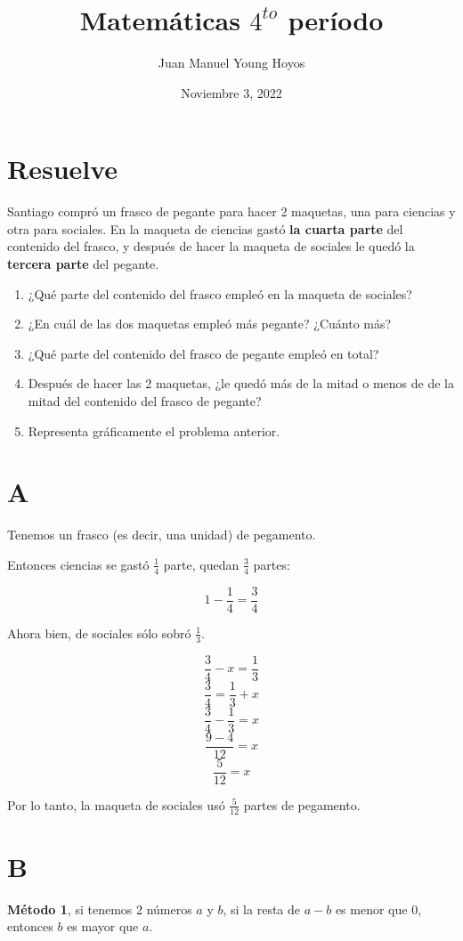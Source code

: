 \documentclass[12pt, letterpaper, twoside]{article}
\title{Matemáticas $4^{to}$ período}
\author{Juan Manuel Young Hoyos}
\date{Noviembre 3, 2022}
\begin{document}
\maketitle

\section*{Resuelve}

Santiago compró un frasco de pegante para hacer 2 maquetas, una para ciencias y
otra para sociales. En la maqueta de ciencias gastó \textbf{la cuarta parte} del
contenido del frasco, y después de hacer la maqueta de sociales le quedó la
\textbf{tercera parte} del pegante.

\renewcommand{\labelenumi}{\Alph{enumi}}
\begin{enumerate}
    \item ¿Qué parte del contenido del frasco empleó en la maqueta de sociales?
    \item ¿En cuál de las dos maquetas empleó más pegante? ¿Cuánto más?
    \item ¿Qué parte del contenido del frasco de pegante empleó en total?
    \item Después de hacer las 2 maquetas, ¿le quedó más de la mitad o menos de
    de la mitad del contenido del frasco de pegante?
    \item Representa gráficamente el problema anterior.
\end{enumerate}

\section*{A}
Tenemos un frasco (es decir, una unidad) de pegamento.

Entonces ciencias se gastó $\frac{1}{4}$ parte, quedan $\frac{3}{4}$ partes:

\[ 1 - \frac{1}{4} = \frac{3}{4} \]

Ahora bien, de sociales sólo sobró $\frac{1}{3}$.

\[ \frac{3}{4} - x = \frac{1}{3} \]
\[ \frac{3}{4} = \frac{1}{3} + x \]
\[ \frac{3}{4} - \frac{1}{3} = x \]
\[ \frac{9 - 4}{12} = x \]
\[ \frac{5}{12} = x \]

Por lo tanto, la maqueta de sociales usó $\frac{5}{12}$ partes de pegamento.

\section*{B}
\textbf{Método 1}, si tenemos 2 números \textbf{$a$} y \textbf{$b$}, si la resta
de \textbf{$a - b$} es menor que \textbf{$0$}, entonces \textbf{$b$} es mayor
que \textbf{$a$}.
\end{document}
